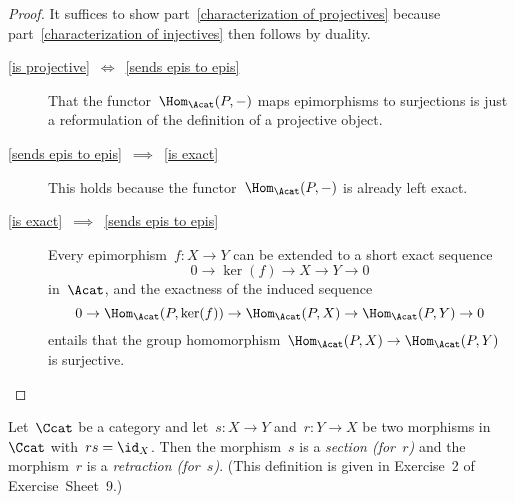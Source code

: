 \begin{proof}
  It suffices to show part~\ref*{characterization of projectives} because part~\ref*{characterization of injectives} then follows by duality.
  
  \begin{description}
    \item[\ref*{is projective}~$\iff$~\ref*{sends epis to epis}]
      That the functor~$\Hom_{\Acat}(P,-)$ maps epimorphisms to surjections is just a reformulation of the definition of a projective object.
    \item[\ref*{sends epis to epis}~$\implies$~\ref*{is exact}]
      This holds because the functor~$\Hom_\Acat(P,-)$ is already left exact.
    \item[\ref*{is exact}~$\implies$~\ref*{sends epis to epis}]
      Every epimorphism~$f \colon X \to Y$ can be extended to a short exact sequence
      \[
        0
        \to
        \ker(f)
        \to
        X
        \to
        Y
        \to
        0
      \]
      in~$\Acat$, and the exactness of the induced sequence
      \[
        0
        \to
        \Hom_\Acat(P,\ker(f))
        \to
        \Hom_\Acat(P,X)
        \to
        \Hom_\Acat(P,Y)
        \to
        0
      \]
      entails that the group homomorphism~$\Hom_\Acat(P,X) \to \Hom_\Acat(P,Y)$ is surjective.
    \qedhere
  \end{description}
\end{proof}




\begin{definition*}
  Let~$\Ccat$ be a category and let~$s \colon X \to Y$ and~$r \colon Y \to X$ be two morphisms in~$\Ccat$ with~$rs = \id_X$.
  Then the morphism~$s$ is a \emph{section \textup(for~$r$\textup)} and the morphism~$r$ is a \emph{retraction \textup(for~$s$\textup)}.
  (This definition is given in Exercise~2 of Exercise~Sheet~9.)
\end{definition*}


